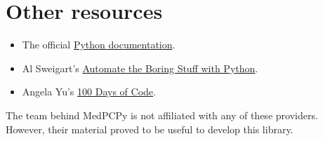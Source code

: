 \documentclass[a4paper,12pt]{article}
\begin{document}
\section{Other resources}

\begin{itemize}
    \item The official \href{https://www.python.org/doc/}{Python documentation}.
    \item Al Sweigart's \href{https://automatetheboringstuff.com/}{Automate the Boring Stuff with Python}.
    \item Angela Yu's \href{https://www.udemy.com/course/100-days-of-code/}{100 Days of Code}.
\end{itemize}

The team behind MedPCPy is not affiliated with any of these providers. However, their material proved to be useful to develop this library.
\end{document}
